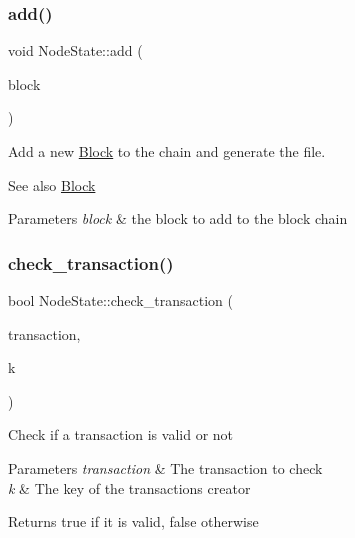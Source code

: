 \subsubsection{\texorpdfstring{add()}{add()}\hspace{0.1cm}{\footnotesize\ttfamily [2/2]}}
{\footnotesize\ttfamily void Node\+State\+::add (\begin{DoxyParamCaption}\item[{\mbox{\hyperlink{classBlock}{Block}} $\ast$}]{block }\end{DoxyParamCaption})}

Add a new \mbox{\hyperlink{classBlock}{Block}} to the chain and generate the file. \begin{DoxySeeAlso}{See also}
\mbox{\hyperlink{classBlock}{Block}}
\end{DoxySeeAlso}

\begin{DoxyParams}{Parameters}
{\em block} & the block to add to the block chain \\
\hline
\end{DoxyParams}
\mbox{\label{classNodeState_ad8fac1372753ec35c9fcee92f71d75d6}} 
\subsubsection{\texorpdfstring{check\+\_\+transaction()}{check\_transaction()}}
{\footnotesize\ttfamily bool Node\+State\+::check\+\_\+transaction (\begin{DoxyParamCaption}\item[{\mbox{\hyperlink{classTransaction}{Transaction}} $\ast$}]{transaction,  }\item[{std\+::string}]{k }\end{DoxyParamCaption})}

Check if a transaction is valid or not


\begin{DoxyParams}{Parameters}
{\em transaction} & The transaction to check \\
\hline
{\em k} & The key of the transaction\textquotesingle{}s creator \\
\hline
\end{DoxyParams}
\begin{DoxyReturn}{Returns}
true if it is valid, false otherwise 
\end{DoxyReturn}
\mbox{\label{classNodeState_a132d657fd8413e9f7eb92237cc66b38c}} 
